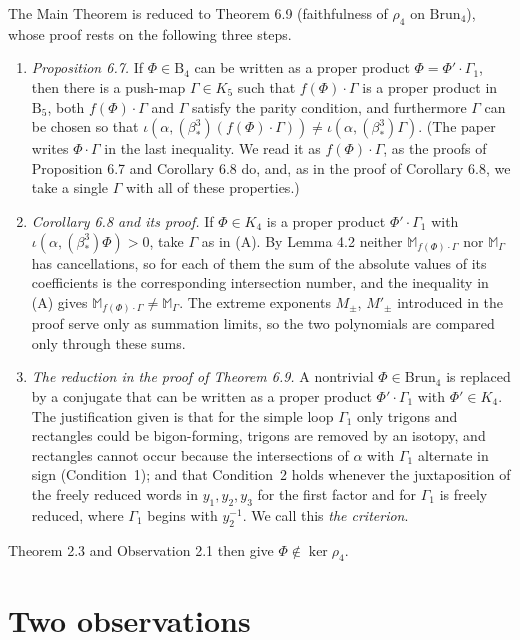 \documentclass[11pt]{amsart}
\theoremstyle{remark}
\newcommand{\M}{\mathbb{M}}
\newcommand{\B}{\mathrm{B}}
\newcommand{\Brun}{\mathrm{Brun}}
\newcommand{\bs}{\beta^3_*}
\begin{document}
The Main Theorem is reduced to Theorem 6.9 (faithfulness of $\rho_4$ on $\Brun_4$), whose proof rests on the following three steps.

\begin{enumerate}
\item[(A)] \emph{Proposition 6.7.} If $\Phi\in \B_4$ can be written as a proper product $\Phi=\Phi'\cdot\Gamma_1$, then there is a push-map $\Gamma\in K_5$ such that $f(\Phi)\cdot\Gamma$ is a proper product in $\B_5$, both $f(\Phi)\cdot\Gamma$ and $\Gamma$ satisfy the parity condition, and furthermore $\Gamma$ can be chosen so that $\iota(\alpha,(\bs)(f(\Phi)\cdot\Gamma))\neq\iota(\alpha,(\bs)\Gamma)$. (The paper writes $\Phi\cdot\Gamma$ in the last inequality. We read it as $f(\Phi)\cdot\Gamma$, as the proofs of Proposition 6.7 and Corollary 6.8 do, and, as in the proof of Corollary 6.8, we take a single $\Gamma$ with all of these properties.)
\item[(B)] \emph{Corollary 6.8 and its proof.} If $\Phi\in K_4$ is a proper product $\Phi'\cdot\Gamma_1$ with $\iota(\alpha,(\bs)\Phi)>0$, take $\Gamma$ as in (A). By Lemma 4.2 neither $\M_{f(\Phi)\cdot\Gamma}$ nor $\M_\Gamma$ has cancellations, so for each of them the sum of the absolute values of its coefficients is the corresponding intersection number, and the inequality in (A) gives $\M_{f(\Phi)\cdot\Gamma}\neq\M_\Gamma$. The extreme exponents $M_\pm$, $M'_\pm$ introduced in the proof serve only as summation limits, so the two polynomials are compared only through these sums.
\item[(C)] \emph{The reduction in the proof of Theorem 6.9.} A nontrivial $\Phi\in\Brun_4$ is replaced by a conjugate that can be written as a proper product $\Phi'\cdot\Gamma_1$ with $\Phi'\in K_4$. The justification given is that for the simple loop $\Gamma_1$ only trigons and rectangles could be bigon-forming, trigons are removed by an isotopy, and rectangles cannot occur because the intersections of $\alpha$ with $\Gamma_1$ alternate in sign (Condition~1); and that Condition~2 holds whenever the juxtaposition of the freely reduced words in $y_1,y_2,y_3$ for the first factor and for $\Gamma_1$ is freely reduced, where $\Gamma_1$ begins with $y_2^{-1}$. We call this \emph{the criterion}.
\end{enumerate}
Theorem 2.3 and Observation 2.1 then give $\Phi\notin\ker\rho_4$.

\section{Two observations}
\end{document}
